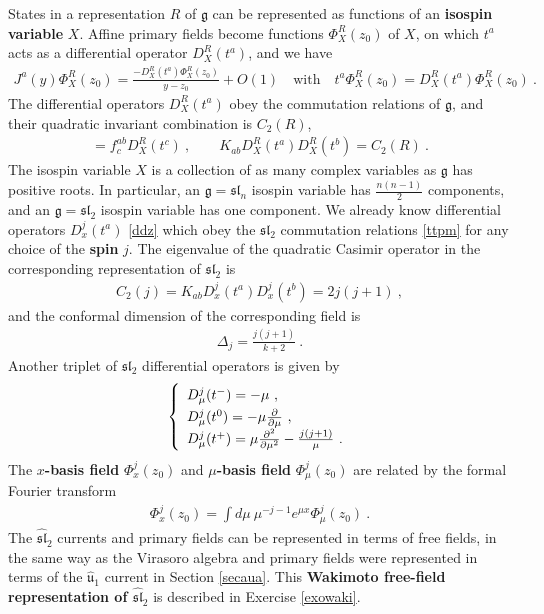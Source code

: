 \documentclass[12pt, a4paper, notitlepage, twoside]{report}
\numberwithin{equation}{section}
\theoremstyle{break}
\begin{document}
States in a representation $R$ of $\mathfrak{g}$ can be represented as functions of an \textbf{\boldmath isospin variable} $X$. 
Affine primary fields become functions $\Phi^R_X(z_0)$ of $X$, on which $t^a$ acts as a differential operator $D_X^R(t^a)$, 
and we have
\begin{align}
 J^a(y)\Phi^R_X(z_0) = \frac{-D^R_X(t^a)\Phi^R_X(z_0)}{y-z_0}+O(1)\quad \text{with} \quad t^a \Phi^R_X(z_0) = D_X^R(t^a) \Phi^R_X(z_0)\ .
\label{jprx}
\end{align}
The differential operators $D_X^R(t^a)$ obey the commutation relations of $\mathfrak{g}$, and their quadratic invariant combination is $C_2(R)$,
\begin{align}
[D_X^R(t^a),D_X^R(t^b)] = f^{ab}_c D_X^R(t^c)\ , \qquad K_{ab} D_X^R(t^a)D_X^R(t^b) = C_2(R)\ .
\label{dta}
\end{align}
The isospin variable $X$ is a collection of as many complex variables as $\mathfrak{g}$ has positive roots.
In particular, an $\mathfrak{g}=\mathfrak{sl}_n$ isospin variable has $\frac{n(n-1)}{2}$ components, and an $\mathfrak{g}=\mathfrak{sl}_2$ isospin variable has one component.
We already know differential operators $D^j_x(t^a)$ \eqref{ddz} which 
obey the $\mathfrak{sl}_2$ commutation relations \eqref{ttpm} for any choice of the 
\textbf{\boldmath spin} $j$.
The eigenvalue of the quadratic Casimir operator in the corresponding representation of $\mathfrak{sl}_2$ is
\begin{align}
 C_2(j) =  K_{ab}D_x^j(t^a)D_x^j(t^b) = 2j(j+1)\ ,
\end{align}
and the conformal dimension of the corresponding field is
\begin{align}
 \Delta_j =\frac{j(j+1)}{k+2}\ .
\label{dj}
\end{align}
Another triplet of $\mathfrak{sl}_2$ differential operators is given by 
\begin{align}
\renewcommand{\arraystretch}{1.3}
\left\{\begin{array}{l}  
 D_\mu^j(t^-) = -\mu \ , \\  D_\mu^j(t^0) = -\mu{\frac{\partial}{\partial \mu}} \ , \\ D_\mu^j(t^+) = \mu\frac{\partial^2}{\partial\mu^2} -\frac{j(j+1)}{\mu}\ . \end{array}\right. 
\label{mub}
\end{align}
The \textbf{\boldmath $x$-basis field} $\Phi^j_x(z_0)$ and \textbf{\boldmath $\mu$-basis field} $\Phi^j_\mu(z_0)$ are related by the formal Fourier transform
\begin{align}
 \Phi_x^j(z_0) = \int d\mu\ \mu^{-j-1}e^{\mu x} \Phi_\mu^j(z_0)\ .
\label{emx}
\end{align}
The $\widehat{\mathfrak{sl}}_2$ currents and primary fields can be represented in terms of free fields, in the same way as the Virasoro algebra and primary fields were represented in terms of the $\hat{\mathfrak{u}}_1$ current in Section \ref{secaua}.
This \textbf{Wakimoto free-field representation of $\widehat{\mathfrak{sl}}_2$} is described in Exercise \ref{exowaki}.
\end{document}
